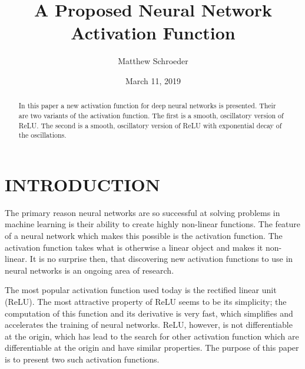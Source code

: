 \documentclass{amsart}
\theoremstyle{definition}
\theoremstyle{remark}
\numberwithin{equation}{section}
\begin{document}
\title{A Proposed Neural Network Activation Function}

\author{Matthew Schroeder}

\date{March 11, 2019}

\begin{abstract}
In this paper a new activation function for deep neural networks is presented.  Their are two variants of the activation function. The first is a smooth, oscillatory version of ReLU. The second is a smooth, oscillatory version of ReLU with exponential decay of the oscillations.
\end{abstract}

\maketitle

\section{INTRODUCTION}
The primary reason neural networks are so successful at solving problems in machine learning is their ability to create highly non-linear functions.   The feature of a neural network which makes this possible is the activation function.  The activation function takes what is otherwise a linear object and makes it non-linear.  It is no surprise then, that discovering new activation functions to use in neural networks is an ongoing area of research.   

The most popular activation function used today is the rectified linear unit (ReLU).  The most attractive property of ReLU seems to be its simplicity; the computation of this function and its derivative is very fast, which simplifies and accelerates the training of neural networks. ReLU, however, is not differentiable at the origin, which has lead to the search for other activation function which are differentiable at the origin and have similar properties.  The purpose of this paper is to present two such activation functions.    
\end{document}
